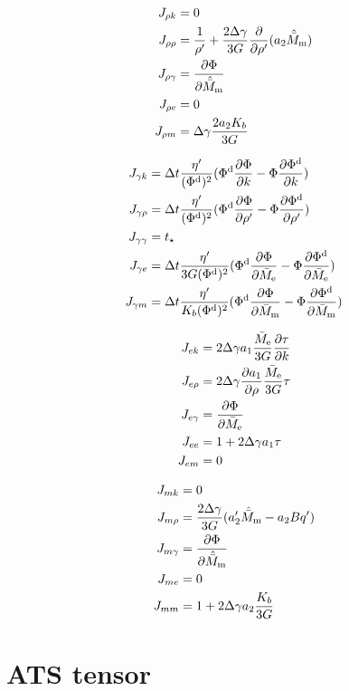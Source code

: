 \documentclass[a4paper,11pt]{article}
\newcommand{\pderiv}[2]{\frac{\partial #1}{\partial #2}}
\newcommand{\rmd}{{\rm d}}
\newcommand{\rme}{{\rm e}}
\newcommand{\rmm}{{\rm m}}
\begin{document}
\begin{align*}
	J_{\rho k} &= 0\\
	J_{\rho \rho} &= \frac{1}{\rho'} + \frac{2\Delta\gamma}{3G}\pderiv{}{\rho'}(a_2\hat{\bar M}_\rmm)\\ %
	J_{\rho \gamma} &= \pderiv{\Phi}{\hat{\bar M}_\rmm}\\
	J_{\rho e} &= 0\\
	J_{\rho m} &= \Delta\gamma \frac{2a_2 K_b}{3G}
\end{align*}

\begin{align*}
	J_{\gamma k} &= \Delta t \frac{\eta'}{(\Phi^\rmd)^2}(\Phi^\rmd \pderiv{\Phi}{k}-\Phi\pderiv{\Phi^\rmd}{k})\\
	J_{\gamma \rho} &= \Delta t \frac{\eta'}{(\Phi^\rmd)^2}(\Phi^\rmd \pderiv{\Phi}{\rho'}-\Phi\pderiv{\Phi^\rmd}{\rho'})\\
	J_{\gamma \gamma} &= t_\star\\
	J_{\gamma e} &= \Delta t \frac{\eta'}{3G(\Phi^\rmd)^2}(\Phi^\rmd \pderiv{\Phi}{\bar M_\rme}-\Phi\pderiv{\Phi^\rmd}{\bar M_\rme})\\
	J_{\gamma m} &= \Delta t \frac{\eta'}{K_b(\Phi^\rmd)^2}(\Phi^\rmd \pderiv{\Phi}{\bar M_\rmm}-\Phi\pderiv{\Phi^\rmd}{\bar M_\rmm})
\end{align*}

\begin{align*}
	J_{e k} &= 2\Delta\gamma a_1 \frac{\bar M_\rme}{3G} \pderiv{\tau}{k}\\
	J_{e \rho} &= 2\Delta\gamma \pderiv{a_1}{\rho} \frac{\bar M_\rme}{3G}\tau\\
	J_{e \gamma} &= \pderiv{\Phi}{\bar M_\rme}\\
	J_{e e} &= 1 + 2\Delta\gamma a_1\tau\\
	J_{e m} &= 0
\end{align*}

\begin{align*}
	J_{m k} &= 0\\
	J_{m \rho} &= \frac{2 \Delta\gamma}{3G}(a_2' \hat{\bar M}_\rmm - a_2 B q')\\
	J_{m \gamma} &= \pderiv{\Phi}{\hat{\bar M}_\rmm}\\
	J_{m e} &= 0\\
	J_{m m} &= 1 + 2\Delta\gamma a_2 \frac{K_b}{3G}
\end{align*}

\section{ATS tensor}
\end{document}
